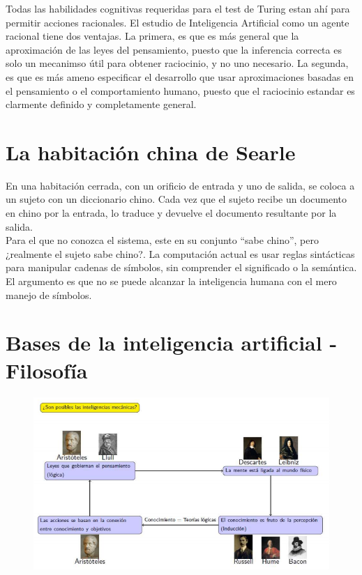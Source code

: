 \documentclass{article}
\begin{document}
Todas las habilidades cognitivas requeridas para el test de Turing estan ahí para permitir acciones racionales. El estudio de Inteligencia Artificial como un agente racional tiene dos ventajas. La primera, es  que es más general que la aproximación de las leyes del pensamiento, puesto que la inferencia correcta es solo un mecanimso útil para obtener raciocinio, y no uno necesario. La segunda, es que es más ameno especificar el desarrollo que usar aproximaciones basadas en el pensamiento o el comportamiento humano, puesto que el raciocinio estandar es clarmente definido y completamente general. \\

\section{La habitación china de Searle}
En una habitación cerrada, con un orificio de entrada y uno de salida, se coloca a un sujeto con un diccionario chino. Cada vez que el sujeto recibe un documento en chino por la entrada, lo traduce y devuelve el documento resultante por la salida. \\

Para el que no conozca el sistema, este en su conjunto ``sabe chino'', pero ¿realmente el sujeto sabe chino?. La computación actual es usar reglas sintácticas para manipular cadenas de símbolos, sin comprender el significado o la semántica. El argumento es que no se puede alcanzar la inteligencia humana con el mero manejo de símbolos.

\section{Bases de la inteligencia artificial - Filosofía}

\begin{figure}[h]
\centering
\includegraphics[scale=1,width=1\textwidth]{esquema_historia.png}
\end{figure}
\end{document}
